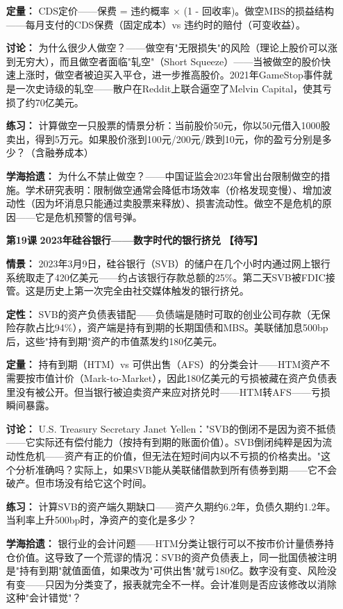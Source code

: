 \documentclass[a4paper,11pt]{ctexart}
\newcommand{\draft}{\textcolor{orange!80!black}{\textbf{【待写】}}}
\begin{document}
\begin{enumerate}
\textbf{定量：} CDS定价——保费 = 违约概率 × (1 - 回收率)。做空MBS的损益结构——每月支付的CDS保费（固定成本）vs 违约时的赔付（可变收益）。

\textbf{讨论：} 为什么很少人做空？——做空有"无限损失"的风险（理论上股价可以涨到无穷大），而且做空者面临"轧空"（Short Squeeze）——当被做空的股价快速上涨时，做空者被迫买入平仓，进一步推高股价。2021年GameStop事件就是一次史诗级的轧空——散户在Reddit上联合逼空了Melvin Capital，使其亏损了约70亿美元。

\textbf{练习：} 计算做空一只股票的情景分析：当前股价50元，你以50元借入1000股卖出，得到5万元。如果股价涨到100元/200元/跌到10元，你的盈亏分别是多少？（含融券成本）

\textbf{学海拾遗：} 为什么不禁止做空？——中国证监会2023年曾出台限制做空的措施。学术研究表明：限制做空通常会降低市场效率（价格发现变慢）、增加波动性（因为坏消息只能通过卖股票来释放）、损害流动性。做空不是危机的原因——它是危机预警的信号弹。

\item[\textbf{第19课}] \textbf{2023年硅谷银行——数字时代的银行挤兑} \draft

\textbf{情景：} 2023年3月9日，硅谷银行（SVB）的储户在几个小时内通过网上银行系统取走了420亿美元——约占该银行存款总额的25\%。第二天SVB被FDIC接管。这是历史上第一次完全由社交媒体触发的银行挤兑。

\textbf{定性：} SVB的资产负债表错配——负债端是随时可取的创业公司存款（无保险存款占比94\%），资产端是持有到期的长期国债和MBS。美联储加息500bp后，这些"持有到期"资产的市值蒸发约180亿美元。

\textbf{定量：} 持有到期（HTM）vs 可供出售（AFS）的分类会计——HTM资产不需要按市值计价（Mark-to-Market），因此180亿美元的亏损被藏在资产负债表里没有被公开。但当银行被迫卖资产来应对挤兑时——HTM转AFS——亏损瞬间暴露。

\textbf{讨论：} U.S. Treasury Secretary Janet Yellen："SVB的倒闭不是因为资不抵债——它实际还有偿付能力（按持有到期的账面价值）。SVB倒闭纯粹是因为流动性危机——资产有正的价值，但无法在短时间内以不亏损的价格卖出。"这个分析准确吗？实际上，如果SVB能从美联储借款到所有债券到期——它不会破产。但市场没有给它这个时间。

\textbf{练习：} 计算SVB的资产端久期缺口——资产久期约6.2年，负债久期约1.2年。当利率上升500bp时，净资产的变化是多少？

\textbf{学海拾遗：} 银行业的会计问题——HTM分类让银行可以不按市价计量债券持仓价值。这导致了一个荒谬的情况：SVB的资产负债表上，同一批国债被注明是"持有到期"就值面值，如果改为"可供出售"就亏180亿。数字没有变、风险没有变——只因为分类变了，报表就完全不一样。会计准则是否应该修改以消除这种"会计错觉"？


\end{enumerate}
\end{document}
